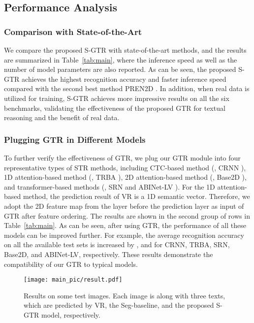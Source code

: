 \documentclass[letterpaper]{article} \usepackage{aaai22}  \usepackage{times}  \usepackage{helvet}  \usepackage{courier}  \usepackage[hyphens]{url}  \usepackage{graphicx} \urlstyle{rm} \def\UrlFont{\rm}  \usepackage{natbib}  \usepackage{caption} \DeclareCaptionStyle{ruled}{labelfont=normalfont,labelsep=colon,strut=off} \frenchspacing  \setlength{\pdfpagewidth}{8.5in}  \setlength{\pdfpageheight}{11in}
\newcommand{\bt}{\color{black}}
\begin{document}
\subsection{Performance Analysis}
\label{subsec:performanceAnalysis}
\subsubsection{Comparison with State-of-the-Art}

We compare the proposed S-GTR with state-of-the-art methods, and the results are summarized in Table~\ref{tab:main}, where the inference speed as well as the number of model parameters are also reported. As can be seen, the proposed S-GTR achieves the highest recognition accuracy and  faster inference speed compared with the second best method PREN2D \cite{yan2021primitive}. In addition, when real data is utilized for training, S-GTR achieves more impressive results on all the six benchmarks, validating the effectiveness of the proposed GTR for textual reasoning and the benefit of real data.



\subsubsection{Plugging GTR in Different Models}


To further verify the effectiveness of GTR, we plug our GTR module into four representative types of STR methods, including CTC-based method (, CRNN \cite{shi2016end}), 1D attention-based method (, TRBA \cite{baek2019wrong}), 2D attention-based method (, Base2D \cite{yan2021primitive}), and transformer-based methods (, SRN \cite{yu2020towards} and {\bt ABINet-LV} \cite{fang2021read}). For the 1D attention-based method, the prediction result of VR is a 1D semantic vector. Therefore, we adopt the 2D feature map from the layer before the prediction layer as input of GTR after feature ordering. The results are shown in the second group of rows in Table~\ref{tab:main}. As can be seen, after using GTR, the performance of all these models can be improved further. For example, the average recognition accuracy on all the available test sets is increased by , and {\bt } for CRNN, TRBA, SRN, Base2D, and {\bt ABINet-LV}, respectively. These results demonstrate the compatibility of our GTR to typical models.



\begin{figure}
	\centering
    \texttt{[image: main\_pic/result.pdf]}
	\caption{Results on some test images. Each image is along with three texts, which are predicted by VR, the Seg-baseline, and the proposed S-GTR model, respectively.}
	\label{main-pic}
\end{figure}
\end{document}
